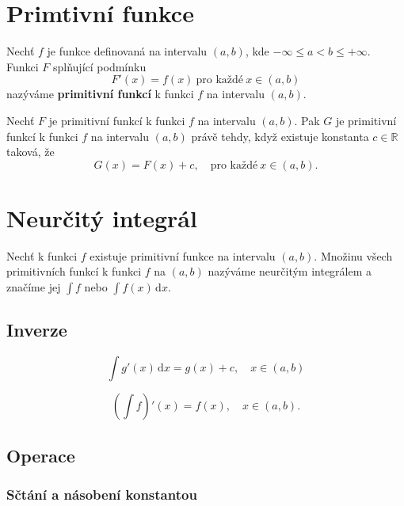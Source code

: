 \documentclass{szzclass}
\author{Daniel Hampl}
\begin{document}

\tableofcontents
\newpage

\section{Primtivní funkce}
Nechť $f$ je funkce definovaná na intervalu $(a,b)$, kde $-\infty\leq a < b\leq + \infty$. Funkci $F$ splňující podmínku
\begin{equation*}
F'(x) = f(x) \ \text{pro každé} \ x \in (a,b)\end{equation*}
nazýváme \textbf{primitivní funkcí} k funkci $f$ na intervalu $(a,b)$.


Nechť $F$ je primitivní funkcí k funkci $f$ na intervalu $(a,b)$.
Pak $G$ je primitivní funkcí k funkci $f$ na intervalu $(a,b)$
právě tehdy, když existuje konstanta $c \in \mathbb{R}$ taková, že
\begin{equation*}
G(x) = F(x) + c, \quad \text{pro každé} \ x\in(a,b).\end{equation*}

\section{Neurčitý integrál}

Nechť k funkci $f$ existuje primitivní funkce na intervalu $(a,b)$.
Množinu všech primitivních funkcí k funkci $f$ na $(a,b)$ nazýváme
neurčitým integrálem a značíme jej $\int f$ nebo $\int f(x) \,\mathrm{d}x$.


\subsection{Inverze}
\begin{equation*}
\int g'(x) \,\mathrm{d}x = g(x) + c, \quad x\in(a,b)\end{equation*}

\begin{equation*}
\left(\int f\right)'(x) = f(x), \quad x\in(a,b).\end{equation*}

\subsection{Operace}

\subsubsection{Sčtání a násobení konstantou}
\end{document}
